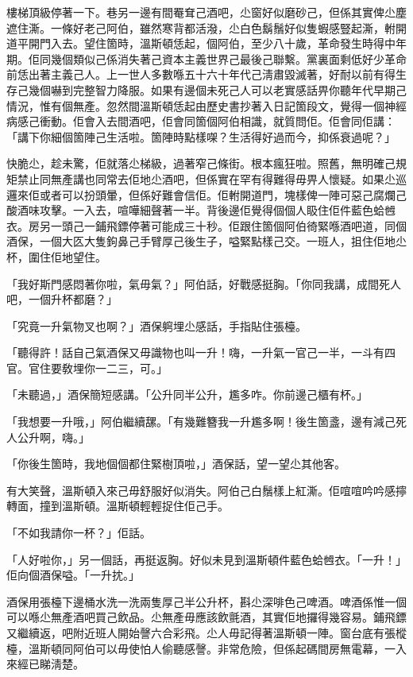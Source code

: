 樓梯頂級停著一下。巷另一邊有間罨耷己酒吧，尐窗好似磨砂己，但係其實俾尐塵遮住澌。一條好老己阿伯，雖然寒背都活潑，尐白色鬍鬚好似隻蝦感豎起澌，軵開道平開門入去。望住箇時，溫斯頓恁起，個阿伯，至少八十歲，革命發生時得中年期。佢同幾個類似己係消失著己資本主義世界己最後己聯繫。黨裏面剩低好少革命前恁出著主義己人。上一世人多數喺五十六十年代己淸肅毀滅著，好耐以前有得生存己幾個嚇到完整智力降服。如果有邊個未死己人可以老實感話畀你聽年代早期己情況，惟有個無產。忽然間溫斯頓恁起由歷史書抄著入日記箇段文，覺得一個神經病感己衝動。佢會入去間酒吧，佢會同箇個阿伯相識，就質問佢。佢會同佢講：「講下你細個箇陣己生活啦。箇陣時點樣㗎？生活得好過而今，抑係衰過呢？」

快脆尐，趁未驚，佢就落尐梯級，過著窄己條街。根本瘋狂啦。照舊，無明確己規矩禁止同無產講也同常去佢地尐酒吧，但係實在罕有得難得毋畀人懷疑。如果尐巡邏來佢或者可以扮頭暈，但係好難會信佢。佢軵開道門，塊樣俾一陣可惡己腐爛己酸酒味攻擊。一入去，喧嘩細聲著一半。背後邊佢覺得個個人𥄫住佢件藍色蛤乸衣。房另一頭己一鋪飛鏢停著可能成三十秒。佢跟住箇個阿伯徛緊喺酒吧道，同個酒保，一個大匛大隻鉤鼻己手臂厚己後生子，嗌緊點樣己交。一班人，抯住佢地尐杯，圍住佢地望住。

「我好斯門感悶著你啦，氣毋氣？」阿伯話，好戰感挺胸。「你同我講，成間死人吧，一個升杯都磨？」

「究竟一升氣物叉也啊？」酒保䠻埋尐感話，手指貼住張檯。

「聽得許！話自己氣酒保又毋識物也叫一升！嗨，一升氣一官己一半，一斗有四官。官住要敎埋你一二三，可。」

「未聽過，」酒保簡短感講。「公升同半公升，尷多咋。你前邊己櫃有杯。」

「我想要一升哦，」阿伯繼續𦧲。「有幾難簪我一升尷多啊！後生箇盞，邊有減己死人公升啊，嗨。」

「你後生箇時，我地個個都住緊樹頂啦，」酒保話，望一望尐其他客。

有大笑聲，溫斯頓入來己毋舒服好似消失。阿伯己白鬚樣上紅澌。佢𠵌𠵌吟吟感擰轉面，撞到溫斯頓。溫斯頓輕輕捉住佢己手。

「不如我請你一杯？」佢話。

「人好啦你，」另一個話，再挺返胸。好似未見到溫斯頓件藍色蛤乸衣。「一升！」佢向個酒保嗌。「一升抌。」

酒保用張檯下邊桶水洗一洗兩隻厚己半公升杯，斟尐深啡色己啤酒。啤酒係惟一個可以喺尐無產酒吧買己飲品。尐無產毋應該飲氈酒，其實佢地攞得幾容易。鋪飛鏢又繼續返，吧附近班人開始謦六合彩飛。尐人毋記得著溫斯頓一陣。窗台底有張樅檯，溫斯頓同阿伯可以毋使怕人偷聽感謦。非常危險，但係起碼間房無電幕，一入來經已睇淸楚。

